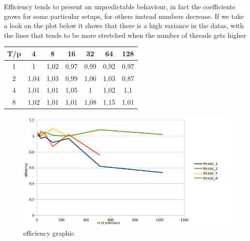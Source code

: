 \documentclass[10pt]{article}
\begin{document}
\begin{multicols}{2}
\noindent 
Efficiency tends to present an unpredictable behaviour,
in fact the coefficients grows for some particular setups,
for others instead numbers decrease. If we take a look on
the plot below it shows that there is a high variance in the
datas, with the lines that tends to be more stretched when the
number of threads gets higher
\newline
\newline
\begin{tabular}{| c | c | c | c | c | c | c |}
  \hline
  T/p & 4	 & 8	& 16	& 32	& 64 & 128  \\
  \hline
  1 & 1	& 1,02 & 0,97 & 0,99 & 0,92 & 0,97  \\
  2 & 1,04 & 1,03 & 0,99 & 1,06 & 1,03 & 0,87 \\	
  4 & 1,01	&1,01&	1,05&	1&	1,02&	1,1	\\	
  8 &1,02&	1,01&	1,01&	1,08&	1,15&	1,01 \\
  \hline
\end{tabular}

\begin{figure}[H]
  \includegraphics[scale=0.3]{img/efficiency.jpg}
  \centering
  \caption{efficiency graphic}
\end{figure}

\end{multicols}



\end{document}
